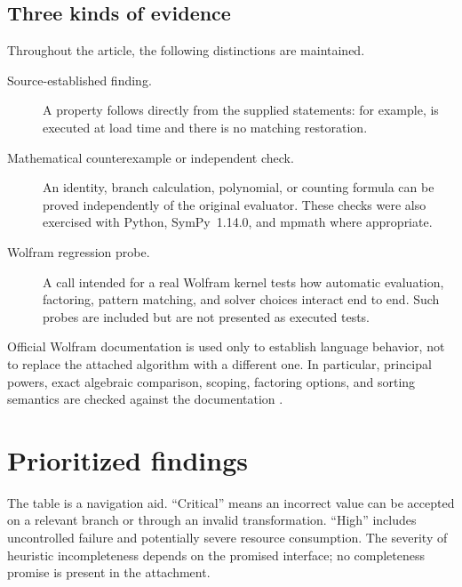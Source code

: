 \documentclass[11pt,letterpaper]{article}
\newcommand{\code}[1]{\texttt{\detokenize{#1}}}
\theoremstyle{definition}
\theoremstyle{remark}
\begin{document}
\subsection{Three kinds of evidence}
Throughout the article, the following distinctions are maintained.
\begin{description}
\item[Source-established finding.] A property follows directly from the supplied
statements: for example, \code{Unprotect[Print]} is executed at load time and
there is no matching restoration.
\item[Mathematical counterexample or independent check.] An identity, branch
calculation, polynomial, or counting formula can be proved independently of
the original evaluator. These checks were also exercised with Python,
SymPy~1.14.0, and mpmath where appropriate.
\item[Wolfram regression probe.] A call intended for a real Wolfram kernel tests
how automatic evaluation, factoring, pattern matching, and solver choices
interact end to end. Such probes are included but are not presented as
executed tests.
\end{description}
Official Wolfram documentation is used only to establish language behavior,
not to replace the attached algorithm with a different one. In particular,
principal powers, exact algebraic comparison, scoping, factoring options, and
sorting semantics are checked against the documentation
\cite{power,possiblezero,rootreduce,block,sort,factorinteger}.

\section{Prioritized findings}
\label{sec:findings}
The table is a navigation aid. ``Critical'' means an incorrect value can be
accepted on a relevant branch or through an invalid transformation. ``High''
includes uncontrolled failure and potentially severe resource consumption.
The severity of heuristic incompleteness depends on the promised interface;
no completeness promise is present in the attachment.
\end{document}
